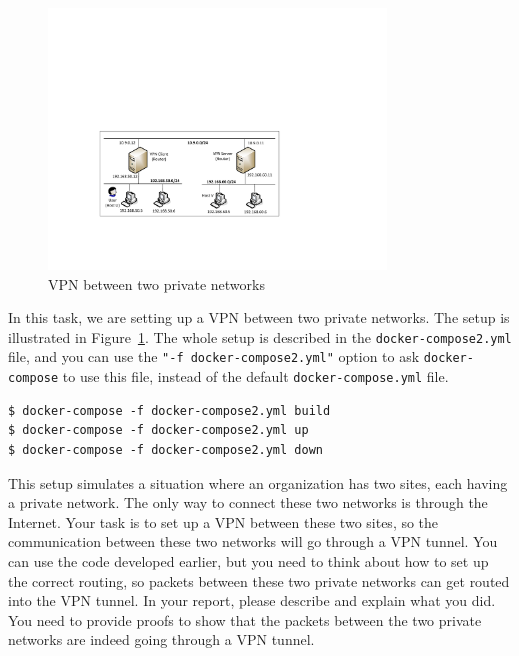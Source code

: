 \begin{figure}[htb]
\begin{center}
\includegraphics[width=0.8\textwidth]{Figs/VPN_3lans.pdf}
\end{center}
\caption{VPN between two private networks}
\label{vpn:fig:two-private-network}
\end{figure}
 
In this task, we are setting up a VPN between two private networks.
The setup is illustrated in Figure~\ref{vpn:fig:two-private-network}.
The whole setup is described in the \texttt{docker-compose2.yml} file, 
and you can use the \texttt{"-f docker-compose2.yml"} option to ask
\texttt{docker-compose} to use this file, instead of the 
default \texttt{docker-compose.yml} file. 


\begin{lstlisting}
$ docker-compose -f docker-compose2.yml build
$ docker-compose -f docker-compose2.yml up
$ docker-compose -f docker-compose2.yml down
\end{lstlisting}


This setup simulates a situation where an organization has two sites, 
each having a private network. The only way to connect these two
networks is through the Internet. 
Your task is to set up a VPN between these two sites, so
the communication between these two networks will go 
through a VPN tunnel. You can use the code developed earlier,
but you need to think about how to set up the correct routing,
so packets between these two private networks can 
get routed into the VPN tunnel. 
In your report, please describe and explain what you did.
You need to provide proofs to show that the packets 
between the two private networks are indeed going through
a VPN tunnel. 


